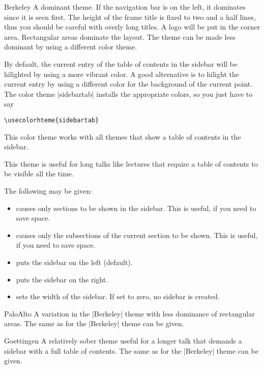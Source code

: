\begin{themeexample}{Berkeley}
  A dominant theme. If the navigation bar is on the left, it dominates
  since it is seen first. The height of the frame title is fixed to
  two and a half lines, thus you should be careful with overly long
  titles. A logo will be put in the corner area. Rectangular areas
  dominate the layout. The theme can be made less dominant by using a
  different color theme.

  By default, the current entry of the table of contents in the
  sidebar will be hilighted by using a more vibrant color. A good
  alternative is to hilight the current entry by using a different
  color for the background of the current point. The color theme
  |sidebartab| installs the appropriate colors, so you just have to
  say
\begin{verbatim}
\usecolorhteme{sidebartab}
\end{verbatim}
  This color theme works with all themes that show a table of contents
  in the sidebar.

  This theme is useful for long talks like lectures that require a
  table of contents to be visible all the time.

  The following  may be given:
  \begin{itemize}
  \item {} causes only sections to be
    shown in the sidebar. This is useful, if you need to save
    space.
  \item {} causes only the subsections
    of the current section to be shown. This is useful, if you need to
    save  space.      
  \item {} puts the sidebar on the left (default).
  \item {} puts the sidebar on the right.
  \item {} sets the width of the
    sidebar. If set to zero, no sidebar is created.
  \end{itemize}
\end{themeexample}

\begin{themeexample}{PaloAlto}
  A variation in the |Berkeley| theme with less dominance of
  rectangular areas. The same  as for the |Berkeley|
  theme can be given. 
\end{themeexample}

\begin{themeexample}{Goettingen}
  A relatively sober theme useful for a longer talk that demands a
  sidebar with a full table of contents.  The same  as
  for the |Berkeley| theme can be given. 
\end{themeexample}

